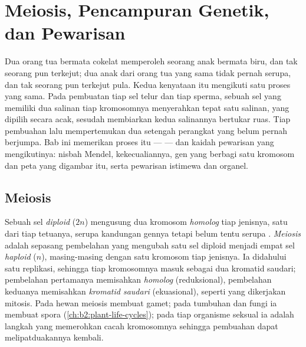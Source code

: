 \chapter{Meiosis, Pencampuran Genetik, dan Pewarisan}\label{ch:b2:meiosis-heredity}

Dua orang tua bermata cokelat memperoleh seorang anak bermata biru, dan
tak seorang pun terkejut; dua anak dari orang tua yang sama tidak
pernah serupa, dan tak seorang pun terkejut pula. Kedua kenyataan itu
mengikuti satu proses yang sama. Pada pembuatan tiap sel telur dan tiap
sperma, sebuah sel yang memiliki dua salinan tiap kromosomnya
menyerahkan tepat satu salinan, yang dipilih secara acak, sesudah
membiarkan kedua salinannya bertukar ruas. Tiap pembuahan lalu
mempertemukan dua setengah perangkat yang belum pernah berjumpa. Bab
ini memerikan proses itu ---  --- dan kaidah pewarisan yang
mengikutinya: nisbah Mendel, kekecualiannya,  gen yang berbagi
satu kromosom dan peta yang digambar  itu, serta pewarisan
istimewa  dan organel.

\section{Meiosis}

\begin{definition}[Meiosis]\label{def:b2:meiosis-heredity:meiosis}
Sebuah sel \emph{diploid} ($2n$) mengusung dua kromosom
\emph{homolog} tiap jenisnya, satu dari tiap tetuanya, serupa
kandungan gennya tetapi belum tentu serupa . \emph{Meiosis}
adalah sepasang pembelahan yang mengubah satu sel diploid menjadi empat
sel \emph{haploid} ($n$), masing-masing dengan satu kromosom tiap
jenisnya. Ia didahului satu replikasi, sehingga tiap kromosomnya masuk
sebagai dua kromatid saudari; pembelahan pertamanya memisahkan
\emph{homolog} (reduksional), pembelahan keduanya memisahkan
\emph{kromatid saudari} (ekuasional), seperti yang dikerjakan mitosis.
Pada hewan meiosis membuat gamet; pada tumbuhan dan fungi ia membuat
spora (\cref{ch:b2:plant-life-cycles}); pada tiap organisme seksual ia
adalah langkah yang memerohkan cacah kromosomnya sehingga pembuahan
dapat melipatduakannya kembali.
\end{definition}


